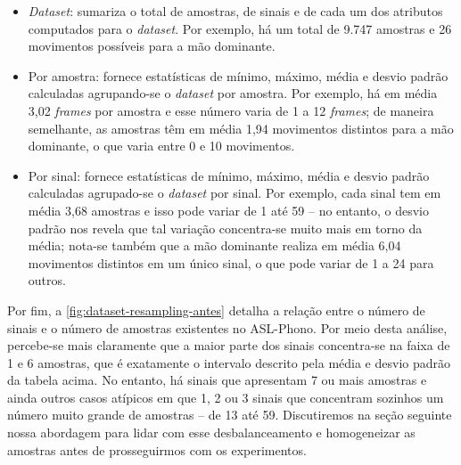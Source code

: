 \begin{itemize}
    \item \textit{Dataset}: sumariza o total de amostras, de sinais e de cada um dos atributos computados para o \textit{dataset}.
          Por exemplo, há um total de 9.747 amostras e 26 movimentos possíveis para a mão dominante.

    \item Por amostra: fornece estatísticas de mínimo, máximo, média e desvio padrão calculadas agrupando-se o \textit{dataset} por amostra.
          Por exemplo, há em média 3,02 \textit{frames} por amostra e esse número varia de 1 a 12 \textit{frames}; de maneira semelhante, as amostras têm em média 1,94 movimentos distintos para a mão dominante, o que varia entre 0 e 10 movimentos.


    \item Por sinal: fornece estatísticas de mínimo, máximo, média e desvio padrão calculadas agrupado-se o \textit{dataset} por sinal.
          Por exemplo, cada sinal tem em média 3,68 amostras e isso pode variar de 1 até 59 -- no entanto, o desvio padrão nos revela que tal variação concentra-se muito mais em torno da média; nota-se também que a mão dominante realiza em média 6,04 movimentos distintos em um único sinal, o que pode variar de 1 a 24 para outros.

\end{itemize}


Por fim, a \autoref{fig:dataset-resampling-antes} detalha a relação entre o número de sinais e o número de amostras existentes no ASL-Phono. Por meio desta análise, percebe-se mais claramente que a maior parte dos sinais concentra-se na faixa de 1 e 6 amostras, que é exatamente o intervalo descrito pela média e desvio padrão da tabela acima.
No entanto, há sinais que apresentam 7 ou mais amostras e ainda outros casos atípicos em que 1, 2 ou 3 sinais que concentram sozinhos um número muito grande de amostras -- de 13 até 59.
Discutiremos na seção seguinte nossa abordagem para lidar com esse desbalanceamento e homogeneizar as amostras antes de prosseguirmos com os experimentos.

